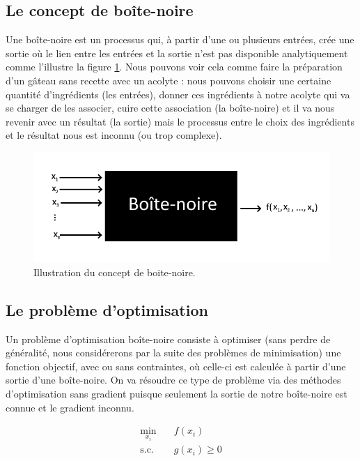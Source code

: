 \documentclass[french]{report}
\begin{document}
\subsection{Le concept de boîte-noire}

Une boîte-noire est un processus qui, à partir d'une ou plusieurs entrées, crée une sortie où le lien entre les entrées et la sortie n'est pas disponible analytiquement comme l'illustre la figure \ref{fig:blackbox}. Nous pouvons voir cela comme faire la préparation d'un gâteau sans recette avec un acolyte : nous pouvons choisir une certaine quantité d'ingrédients (les entrées), donner ces ingrédients à notre acolyte qui va se charger de les associer, cuire cette association (la boîte-noire) et il va nous revenir avec un résultat (la sortie) mais le processus entre le choix des ingrédients et le résultat nous est inconnu (ou trop complexe).

\begin{figure}
    \centering
    \includegraphics[width=13cm]{blackbox.png}
    \caption{Illustration du concept de boite-noire.}
    \label{fig:blackbox}
\end{figure}

\subsection{Le problème d'optimisation}

Un problème d'optimisation boîte-noire consiste à optimiser (sans perdre de généralité, nous considérerons par la suite des problèmes de minimisation) une fonction objectif, avec ou sans contraintes, où celle-ci est calculée à partir d'une sortie d'une boîte-noire. On va résoudre ce type de problème via des méthodes d'optimisation sans gradient puisque seulement la sortie de notre boîte-noire est connue et le gradient inconnu.


\begin{equation}
    \begin{aligned}
        \min_{x_i} \quad    & f(x_{i})     \\
        \textrm{s.c.} \quad & g(x_i) \geq0 \\
    \end{aligned}
\end{equation}
\end{document}
